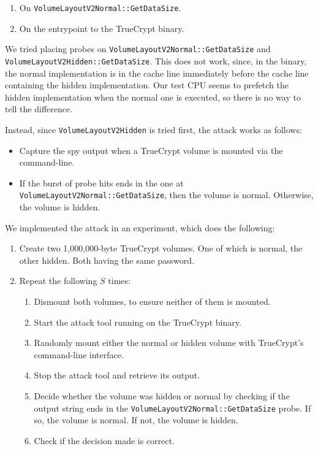 \documentclass{acm_proc_article-sp}
\begin{document}
\begin{enumerate}
    \item On \texttt{VolumeLayoutV2Normal::GetDataSize}.
    \item On the entrypoint to the TrueCrypt binary.
\end{enumerate}

We tried placing probes on \texttt{VolumeLayoutV2Normal::GetDataSize} and
\texttt{VolumeLayoutV2Hidden::GetDataSize}. This does not work, since, in the
binary, the normal implementation is in the cache line immediately before the
cache line containing the hidden implementation. Our test CPU seems to prefetch
the hidden implementation when the normal one is executed, so there is no way to
tell the difference.

Instead, since \texttt{VolumeLayoutV2Hidden} is tried first, the attack works as
follows:

\begin{itemize}
    \item Capture the spy output when a TrueCrypt volume is mounted via the
          command-line.
      \item If the burst of probe hits ends in the one at
          \texttt{VolumeLayoutV2Normal::GetDataSize}, then the volume is normal.
          Otherwise, the volume is hidden.
\end{itemize}

We implemented the attack in an experiment, which does the following:

\begin{enumerate}
    \item Create two 1,000,000-byte TrueCrypt volumes. One of which is normal,
        the other hidden. Both having the same password.
    \item Repeat the following $S$ times:
        \begin{enumerate}
            \item Dismount both volumes, to ensure neither of them is mounted.
            \item Start the attack tool running on the TrueCrypt binary.
            \item Randomly mount either the normal or hidden volume with
                  TrueCrypt's command-line interface.
            \item Stop the attack tool and retrieve its output.
            \item Decide whether the volume was hidden or normal by checking if
                the output string ends in the
                \texttt{VolumeLayoutV2Normal::GetDataSize} probe. If so, the
                volume is normal. If not, the volume is hidden.
            \item Check if the decision made is correct.
        \end{enumerate}
\end{enumerate}
\end{document}

